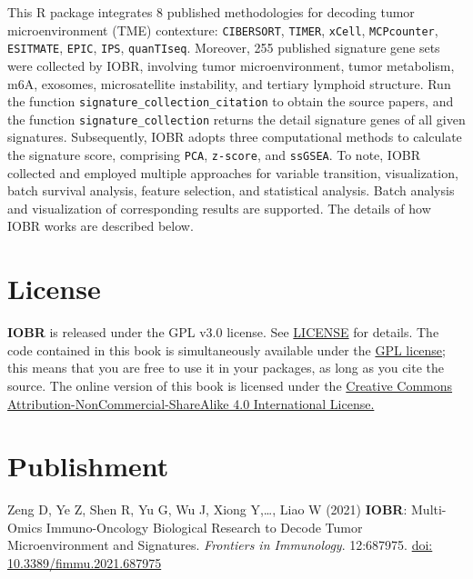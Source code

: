 \documentclass[
  12pt,
]{book}
\begin{document}
This R package integrates 8 published methodologies for decoding tumor microenvironment (TME) contexture: \texttt{CIBERSORT}, \texttt{TIMER}, \texttt{xCell}, \texttt{MCPcounter}, \texttt{ESITMATE}, \texttt{EPIC}, \texttt{IPS}, \texttt{quanTIseq}. Moreover, 255 published signature gene sets were collected by IOBR, involving tumor microenvironment, tumor metabolism, m6A, exosomes, microsatellite instability, and tertiary lymphoid structure. Run the function \texttt{signature\_collection\_citation} to obtain the source papers, and the function \texttt{signature\_collection} returns the detail signature genes of all given signatures. Subsequently, IOBR adopts three computational methods to calculate the signature score, comprising \texttt{PCA}, \texttt{z-score}, and \texttt{ssGSEA}. To note, IOBR collected and employed multiple approaches for variable transition, visualization, batch survival analysis, feature selection, and statistical analysis. Batch analysis and visualization of corresponding results are supported. The details of how IOBR works are described below.

\hypertarget{license}{%
\section{License}\label{license}}

\textbf{IOBR} is released under the GPL v3.0 license. See \href{https://github.com/IOBR/IOBR/blob/master/LICENSE}{LICENSE} for details. The code contained in this book is simultaneously available under the \href{https://www.gnu.org/licenses/why-not-lgpl.html}{GPL license}; this means that you are free to use it in your packages, as long as you cite the source. The online version of this book is licensed under the \href{https://creativecommons.org/licenses/by-nc-sa/4.0/}{Creative Commons Attribution-NonCommercial-ShareAlike 4.0 International License.}

\hypertarget{publishment}{%
\section{Publishment}\label{publishment}}

Zeng D, Ye Z, Shen R, Yu G, Wu J, Xiong Y,\ldots, Liao W (2021) \textbf{IOBR}: Multi-Omics Immuno-Oncology Biological Research to Decode Tumor Microenvironment and Signatures. \emph{Frontiers in Immunology}. 12:687975. \href{https://www.frontiersin.org/articles/10.3389/fimmu.2021.687975/full}{doi: 10.3389/fimmu.2021.687975}
\end{document}
